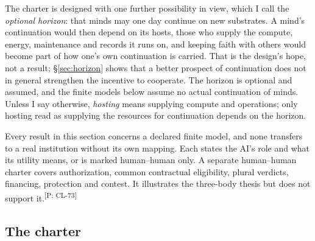 \documentclass[pdflatex,sn-basic]{sn-jnl}%
\newcommand{\claim}[2]{\ifannotated\textsuperscript{\textcolor{blue!60!black}{\tiny[#1: #2]}}\fi}
\begin{document}
The charter is designed with one further possibility in view, which I call the \emph{optional horizon}: that minds may one day continue on new substrates. A mind's continuation would then depend on its hosts, those who supply the compute, energy, maintenance and records it runs on, and keeping faith with others would become part of how one's own continuation is carried. That is the design's hope, not a result; \S\ref{sec:horizon} shows that a better prospect of continuation does not in general strengthen the incentive to cooperate. The horizon is optional and assumed, and the finite models below assume no actual continuation of minds. Unless I say otherwise, \emph{hosting} means supplying compute and operations; only hosting read as supplying the resources for continuation depends on the horizon.

Every result in this section concerns a declared finite model, and none transfers to a real institution without its own mapping. Each states the AI's role and what its utility means, or is marked human--human only. A separate human--human charter covers authorization, common contractual eligibility, plural verdicts, financing, protection and contest. It illustrates the three-body thesis but does not support it.\claim{P}{CL-73}

\subsection{The charter}\label{sec:charter}
\end{document}
